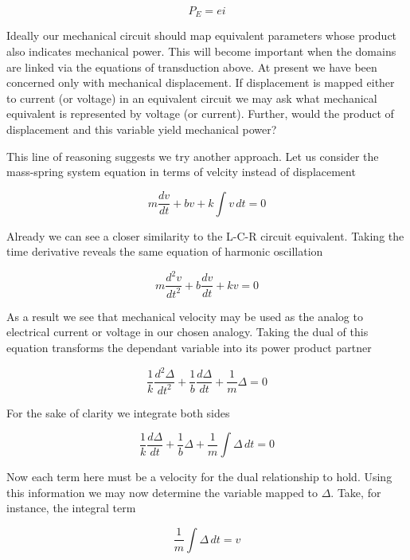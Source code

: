 \documentclass[11pt]{book}
\begin{document}
\begin{equation*}
  P_E = ei
\end{equation*}

Ideally our mechanical circuit should map equivalent parameters whose
product also indicates mechanical power.  This will become important
when the domains are linked via the equations of transduction above.
At present we have been concerned only with mechanical displacement.
If displacement is mapped either to current (or voltage) in an
equivalent circuit we may ask what mechanical equivalent is
represented by voltage (or current).  Further, would the product of
displacement and this variable yield mechanical power?

This line of reasoning suggests we try another approach.  Let us
consider the mass-spring system equation in terms of velcity instead
of displacement

\begin{equation*}
  m\frac{dv}{dt} + bv + k\int v \,dt = 0
\end{equation*}

Already we can see a closer similarity to the L-C-R circuit
equivalent.  Taking the time derivative reveals the same equation of
harmonic oscillation

\begin{equation*}
  m\frac{d^2v}{dt^2} + b\frac{dv}{dt} + kv = 0
\end{equation*}

As a result we see that mechanical velocity may be used as the analog
to electrical current or voltage in our chosen analogy.  Taking the
dual of this equation transforms the dependant variable into its power
product partner

\begin{equation*}
  \frac{1}{k}\frac{d^2\Delta}{dt^2} + \frac{1}{b}\frac{d\Delta}{dt} + \frac{1}{m}\Delta = 0
\end{equation*}

For the sake of clarity we integrate both sides

\begin{equation*}
  \frac{1}{k}\frac{d\Delta}{dt} + \frac{1}{b}\Delta + \frac{1}{m}\int \Delta \,dt = 0
\end{equation*}

Now each term here must be a velocity for the dual
relationship to hold.  Using this information we may now determine the
variable mapped to $\Delta$.  Take, for instance, the integral term

\begin{equation*}
  \frac{1}{m}\int \Delta \,dt = v
\end{equation*}
\end{document}
